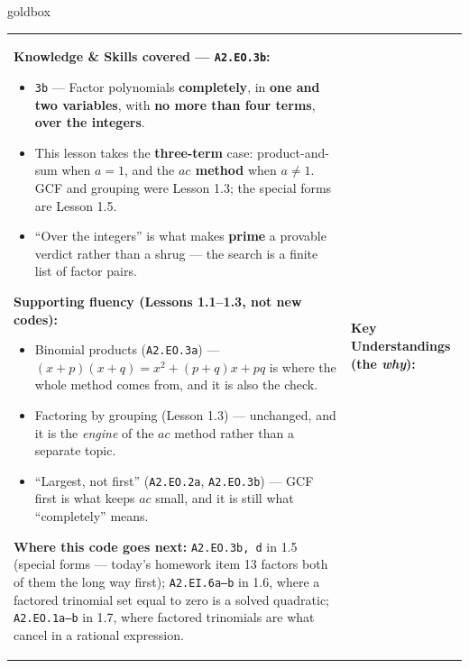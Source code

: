 \documentclass[10pt]{article}
\begin{document}
\renewcommand{\arraystretch}{1.6}
\begin{skillbox}{goldbox}
\begin{tabularx}{\linewidth}{@{}X|X@{}}
\begin{minipage}[t]{\linewidth}\vspace{0pt}
\textbf{Knowledge \& Skills covered --- \texttt{A2.EO.3b}:}
\begin{itemize}[leftmargin=1.1em, itemsep=2pt, topsep=2pt]
  \item \texttt{3b} --- Factor polynomials \textbf{completely}, in \textbf{one and two variables},
        with \textbf{no more than four terms}, \textbf{over the integers}.
  \item This lesson takes the \textbf{three-term} case: product-and-sum when $a=1$, and the
        \textbf{$ac$ method} when $a \ne 1$. GCF and grouping were Lesson 1.3; the special forms
        are Lesson 1.5.
  \item ``Over the integers'' is what makes \textbf{prime} a provable verdict rather than a
        shrug --- the search is a finite list of factor pairs.
\end{itemize}
\textbf{Supporting fluency (Lessons 1.1--1.3, not new codes):}
\begin{itemize}[leftmargin=1.1em, itemsep=2pt, topsep=2pt]
  \item Binomial products (\texttt{A2.EO.3a}) --- $(x+p)(x+q)=x^2+(p+q)x+pq$ is where the whole
        method comes from, and it is also the check.
  \item Factoring by grouping (Lesson 1.3) --- unchanged, and it is the \emph{engine} of the $ac$
        method rather than a separate topic.
  \item ``Largest, not first'' (\texttt{A2.EO.2a}, \texttt{A2.EO.3b}) --- GCF first is what keeps
        $ac$ small, and it is still what ``completely'' means.
\end{itemize}
\textbf{Where this code goes next:} \texttt{A2.EO.3b, d} in 1.5 (special forms --- today's homework
item 13 factors both of them the long way first); \texttt{A2.EI.6a--b} in 1.6, where a factored
trinomial set equal to zero is a solved quadratic; \texttt{A2.EO.1a--b} in 1.7, where factored
trinomials are what cancel in a rational expression.
\end{minipage}
&
\begin{minipage}[t]{\linewidth}\vspace{0pt}
\textbf{Key Understandings (the \emph{why}):}
\begin{itemize}[leftmargin=1.1em, itemsep=2pt, topsep=2pt]

\end{itemize}
\end{minipage}
\end{tabularx}
\end{skillbox}
\end{document}
